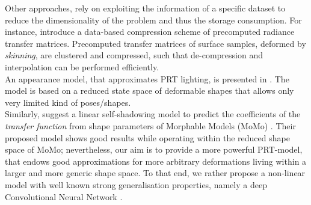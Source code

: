 Other approaches, rely on exploiting the information of a specific dataset to reduce the dimensionality of the problem and thus the storage consumption. For instance, \cite{SkinningPRT} introduce a data-based compression scheme of precomputed radiance transfer matrices. Precomputed transfer matrices of surface samples, deformed by \textit{skinning}, are clustered and compressed, such that de-compression and interpolation can be performed efficiently.
\\  
An appearance model, that approximates PRT lighting, is presented in  \cite{James_Fatahalian}. The model is based on a reduced state space of deformable shapes that allows only very limited kind of poses/shapes. 
\\
Similarly, \cite{MoMoPRT} suggest a linear self-shadowing model to predict the coefficients of the \textit{transfer function} from shape parameters of Morphable Models (MoMo) \cite{MoMo}. Their proposed model shows good results while operating within the reduced shape space of MoMo; nevertheless, our aim is to provide a more powerful PRT-model, that endows good approximations for more arbitrary deformations living within a larger and more generic shape space. To that end, we rather propose a non-linear model with well known strong generalisation properties, namely a deep Convolutional Neural Network \cite{DL_nature, ImageNet_CNN, CNN_videoClassification}.  

